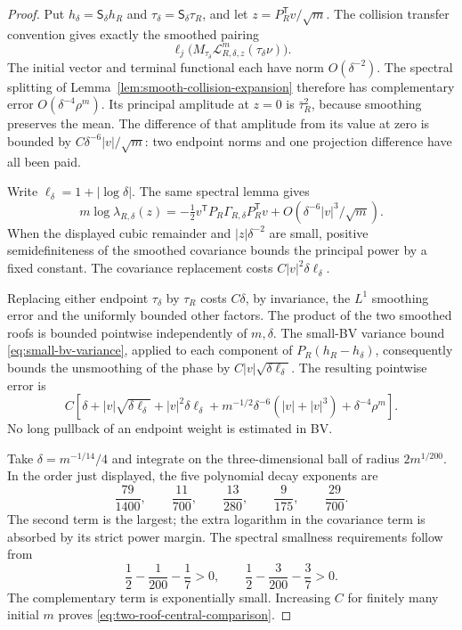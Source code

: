 \begin{proof}
Put $h_\delta=\mathsf S_\delta h_R$ and
$\tau_\delta=\mathsf S_\delta\tau_R$, and let
$z=P_R^{\mathsf T}v/\sqrt m$. The collision transfer convention gives
exactly the smoothed pairing
\[
 \ell_j\bigl(M_{\tau_\delta}\mathcal L_{R,\delta,z}^{m}
                                        (\tau_\delta\nu)\bigr).
\]
The initial vector and terminal functional each have norm
$O(\delta^{-2})$. The spectral splitting of
Lemma~\ref{lem:smooth-collision-expansion} therefore has complementary
error $O(\delta^{-4}\rho^m)$. Its principal amplitude at $z=0$ is
$\bar\tau_R^2$, because smoothing preserves the mean. The difference
of that amplitude from its value at zero is bounded by
$C\delta^{-6}|v|/\sqrt m$: two endpoint norms and one projection
difference have all been paid.

Write $\ell_\delta=1+|\log\delta|$. The same spectral lemma gives
\[
 m\log\lambda_{R,\delta}(z)
 =-\tfrac12v^{\mathsf T}P_R\Gamma_{R,\delta}P_R^{\mathsf T}v
                           +O(\delta^{-6}|v|^3/\sqrt m).
\]
When the displayed cubic remainder and $|z|\delta^{-2}$ are small,
positive semidefiniteness of the smoothed covariance bounds the
principal power by a fixed constant. The covariance replacement costs
$C|v|^2\delta\ell_\delta$.

Replacing either endpoint $\tau_\delta$ by $\tau_R$ costs $C\delta$,
by invariance, the $L^1$ smoothing error and the uniformly bounded
other factors. The product of the two smoothed roofs is bounded
pointwise independently of $m,\delta$. The small-BV variance bound
\eqref{eq:small-bv-variance}, applied to each component of
$P_R(h_R-h_\delta)$, consequently bounds the unsmoothing of the phase
by $C|v|\sqrt{\delta\ell_\delta}$. The resulting pointwise error is
\[
 C\left[\delta+|v|\sqrt{\delta\ell_\delta}
 +|v|^2\delta\ell_\delta
 +m^{-1/2}\delta^{-6}(|v|+|v|^3)+\delta^{-4}\rho^m\right].
\]
No long pullback of an endpoint weight is estimated in BV.

Take $\delta=m^{-1/14}/4$ and integrate on the three-dimensional
ball of radius $2m^{1/200}$. In the order just displayed, the five
polynomial decay exponents are
\[
 \frac{79}{1400},\qquad \frac{11}{700},\qquad
 \frac{13}{280},\qquad \frac9{175},\qquad \frac{29}{700}.
\]
The second term is the largest; the extra logarithm in the covariance
term is absorbed by its strict power margin. The spectral smallness
requirements follow from
\[
 \frac12-\frac1{200}-\frac17>0,\qquad
 \frac12-\frac3{200}-\frac37>0.
\]
The complementary term is exponentially small. Increasing $C$ for
finitely many initial $m$ proves \eqref{eq:two-roof-central-comparison}.
\end{proof}

